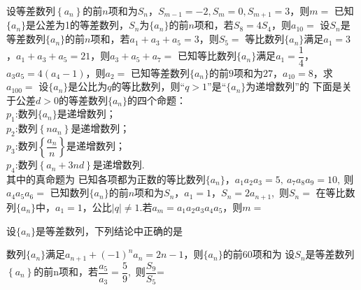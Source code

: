 \documentclass[marginline,noindent,answers,adobefonts]{BHCexam}
\newcommand{\an}{\{a_n\}}
\newcommand{\sn}{S_n}
\begin{document}
\fubiaoti{}
\maketitle
\begin{questions}
 
\question
设等差数列$\left\{a_n\right\}$的前$n$项和为$S_n$，$S_{m-1}=-2,S_m=0,S_{m+1}=3$，则$m=$\xx
{}
\qs
已知$\an$是公差为1的等差数列，$\sn$为$\an$的前$n$项和，若$S_8=4S_4$，则$a_{10}=$\xx
{}
\qs 设$\sn$是等差数列$\an$的前$n$项和，若$a_1+a_3+a_5=3$，则$S_5=$\xx
{}
\qs 等比数列$\{a_n\}$满足$a_1=3$，$a_1+a_3+a_5=21$，则$ a_3+a_5+a_7= $\xx
{}
\qs 已知等比数列$\an$满足$a_1=\dfrac{1}{4}$，$a_3a_5=4(a_4-1)$，则$a_2=$\xx
{}
\qs
已知等差数列$ \an $的前$ 9 $项和为$27$，$a_{10}=8$，求$a_{100}=$\xx
{}
\qs
设$ \an $是公比为$q$的等比数列，则“$ q>1$”是“$ \an $为递增数列”的\xx
{}
\qs
下面是关于公差$d>0$的等差数列$ \an $的四个命题：\\
$p_1$:数列$ \an $是递增数列；\\
$p_2$:数列$ \left\{na_n\right\} $是递增数列；\\
$p_3$:数列$ \left\{\dfrac{a_n}{n}\right\} $是递增数列；\\
$p_4$:数列$\left\{a_n+3nd\right\}$是递增数列.\\
其中的真命题为\xx
{}
\qs 已知各项都为正数的等比数列$\{a_n\}$，$a_1a_2a_3=5,~a_7a_8a_9=10,~  $则$ a_4a_5a_6= $\xx
{}
\qs 已知数列$\{a_n\}$的前$n$项和为$S_n$，$a_1=1$，$S_n=2a_{n+1}$,~则$S_n=$\xx
{}
\qs
在等比数列$\{a_n\}$中，$a_1=1$，公比$ |q|\ne 1 $.若$ a_m=a_1a_2a_3a_4a_5 $，则$ m= $\xx
{}

\qs 
设$ \an $是等差数列，下列结论中正确的是\xx
{}

\qs 数列$ \an $满足$ a_{n+1}+(-1)^na_n=2n-1 $，则$\{a_n\}$的前$ 60 $项和为\xx
{}
\qs 设$S_n$是等差数列$\left\{a_n\right\}$的前n项和，若$\dfrac{a_5}{a_3}=\dfrac{5}{9}$,~则$ \dfrac{S_9}{S_5} $=\xx
{}


\end{questions}
\end{document}
